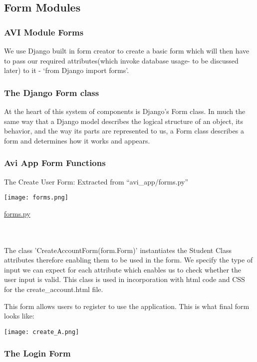\documentclass[10pt]{article}
\begin{document}
\subsection{Form Modules}

\subsubsection{AVI Module Forms}
We use Django built in form creator to create a basic form which will then have to pass our required attributes(which invoke database usage- to be discussed later) to it - ‘from Django import forms’.

\subsubsection{The Django Form class}
At the heart of this system of components is Django’s Form class. In much the same way that a Django model describes the logical structure of an object, its behavior, and the way its parts are represented to us, a Form class describes a form and determines how it works and appears.

\subsubsection{Avi App Form Functions}
The Create User Form: Extracted from “avi\_app/forms.py”

\begin{center}
\texttt{[image: forms.png]}
\end{center}
\caption{\underline{forms.py}} \\ \\

The class ’CreateAccountForm(form.Form)’ instantiates the Student Class attributes therefore enabling them to be used in the form. We specify the type of input we can expect for each attribute which enables us to check whether the user input is valid. This class is used in incorporation with html code and CSS for the create\_account.html file. 

This form allows users to register to use the application. This is what final form looks like:

\begin{center}
\texttt{[image: create\_A.png]}
\end{center}

\subsubsection{The Login Form}
\end{document}
